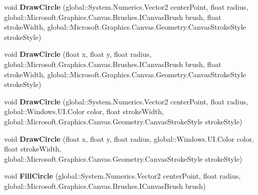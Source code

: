 \begin{DoxyCompactItemize}
\mbox{\label{class_microsoft_1_1_graphics_1_1_canvas_1_1_canvas_drawing_session_a7253ab91f4de1b7b8a1ea35869259db2}} 
void {\bfseries Draw\+Circle} (global\+::\+System.\+Numerics.\+Vector2 center\+Point, float radius, global\+::\+Microsoft.\+Graphics.\+Canvas.\+Brushes.\+I\+Canvas\+Brush brush, float stroke\+Width, global\+::\+Microsoft.\+Graphics.\+Canvas.\+Geometry.\+Canvas\+Stroke\+Style stroke\+Style)
\item 
\mbox{\label{class_microsoft_1_1_graphics_1_1_canvas_1_1_canvas_drawing_session_a824c2ca0465674a6ae0c468c0e7b1db3}} 
void {\bfseries Draw\+Circle} (float x, float y, float radius, global\+::\+Microsoft.\+Graphics.\+Canvas.\+Brushes.\+I\+Canvas\+Brush brush, float stroke\+Width, global\+::\+Microsoft.\+Graphics.\+Canvas.\+Geometry.\+Canvas\+Stroke\+Style stroke\+Style)
\item 
\mbox{\label{class_microsoft_1_1_graphics_1_1_canvas_1_1_canvas_drawing_session_aed7e798b251107e311a60692a765c119}} 
void {\bfseries Draw\+Circle} (global\+::\+System.\+Numerics.\+Vector2 center\+Point, float radius, global\+::\+Windows.\+U\+I.\+Color color, float stroke\+Width, global\+::\+Microsoft.\+Graphics.\+Canvas.\+Geometry.\+Canvas\+Stroke\+Style stroke\+Style)
\item 
\mbox{\label{class_microsoft_1_1_graphics_1_1_canvas_1_1_canvas_drawing_session_a60b1f54cf2c911a8bd2f75bad37eb567}} 
void {\bfseries Draw\+Circle} (float x, float y, float radius, global\+::\+Windows.\+U\+I.\+Color color, float stroke\+Width, global\+::\+Microsoft.\+Graphics.\+Canvas.\+Geometry.\+Canvas\+Stroke\+Style stroke\+Style)
\item 
\mbox{\label{class_microsoft_1_1_graphics_1_1_canvas_1_1_canvas_drawing_session_a8c2a207a7a66049f42625d17605c921d}} 
void {\bfseries Fill\+Circle} (global\+::\+System.\+Numerics.\+Vector2 center\+Point, float radius, global\+::\+Microsoft.\+Graphics.\+Canvas.\+Brushes.\+I\+Canvas\+Brush brush)
\item 
\mbox{\label{class_microsoft_1_1_graphics_1_1_canvas_1_1_canvas_drawing_session_ab32da62378a622647806e11cb61222f9}} 

\end{DoxyCompactItemize}
